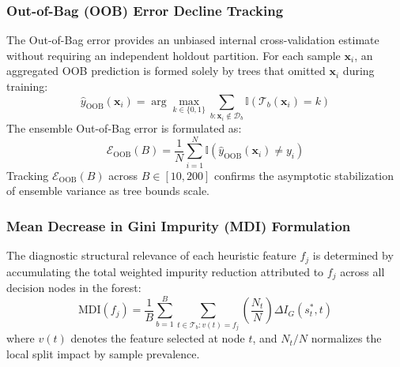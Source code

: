 \subsubsection{Out-of-Bag (OOB) Error Decline Tracking}
The Out-of-Bag error provides an unbiased internal cross-validation estimate without requiring an independent holdout partition. For each sample $\mathbf{x}_i$, an aggregated OOB prediction is formed solely by trees that omitted $\mathbf{x}_i$ during training:
\begin{equation}
    \hat{y}_{\text{OOB}}(\mathbf{x}_i) = \arg\max_{k \in \{0, 1\}} \sum_{b: \mathbf{x}_i \notin \mathcal{D}_b} \mathbb{I}\left(\mathcal{T}_b(\mathbf{x}_i) = k\right)
    \label{eq:oob_pred}
\end{equation}
The ensemble Out-of-Bag error is formulated as:
\begin{equation}
    \mathcal{E}_{\text{OOB}}(B) = \frac{1}{N} \sum_{i=1}^N \mathbb{I}\left(\hat{y}_{\text{OOB}}(\mathbf{x}_i) \neq y_i\right)
    \label{eq:oob_error}
\end{equation}
Tracking $\mathcal{E}_{\text{OOB}}(B)$ across $B \in [10, 200]$ confirms the asymptotic stabilization of ensemble variance as tree bounds scale.

\subsubsection{Mean Decrease in Gini Impurity (MDI) Formulation}
The diagnostic structural relevance of each heuristic feature $f_j$ is determined by accumulating the total weighted impurity reduction attributed to $f_j$ across all decision nodes in the forest:
\begin{equation}
    \text{MDI}(f_j) = \frac{1}{B} \sum_{b=1}^B \sum_{t \in \mathcal{T}_b: v(t) = f_j} \left( \frac{N_t}{N} \right) \Delta I_G(s^*_t, t)
    \label{eq:mdi_weight}
\end{equation}
where $v(t)$ denotes the feature selected at node $t$, and $N_t / N$ normalizes the local split impact by sample prevalence.

